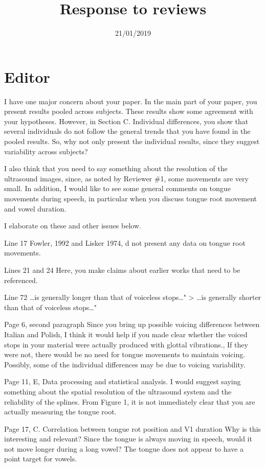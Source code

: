 \documentclass[]{article}
\title{Response to reviews}
\author{}
\date{21/01/2019}
\begin{document}
\maketitle

\hypertarget{editor}{%
\section{Editor}\label{editor}}

I have one major concern about your paper. In the main part of your
paper, you present results pooled across subjects. These results show
some agreement with your hypotheses. However, in Section C. Individual
differences, you show that several individuals do not follow the general
trends that you have found in the pooled results. So, why not only
present the individual results, since they suggest variability across
subjects?

I also think that you need to say something about the resolution of the
ultrasound images, since, as noted by Reviewer \#1, some movements are
very small. In addition, I would like to see some general comments on
tongue movements during speech, in particular when you discuss tongue
root movement and vowel duration.

I elaborate on these and other issues below.

Line 17 Fowler, 1992 and Lisker 1974, d not present any data on tongue
root movements.

Lines 21 and 24 Here, you make claims about earlier works that need to
be referenced.

Line 72 \ldots{}is generally longer than that of voiceless
stops\ldots{}" \textgreater{} \ldots{}is generally shorter than that of
voiceless stops\ldots{}"

Page 6, second paragraph Since you bring up possible voicing differences
between Italian and Polish, I think it would help if you made clear
whether the voiced stops in your material were actually produced with
glottal vibrations., If they were not, there would be no need for tongue
movements to maintain voicing. Possibly, some of the individual
differences may be due to voicing variability.

Page 11, E, Data processing and statistical analysis. I would suggest
saying something about the spatial resolution of the ultrasound system
and the reliability of the splines. From Figure 1, it is not immediately
clear that you are actually measuring the tongue root.

Page 17, C. Correlation between tongue rot position and V1 duration Why
is this interesting and relevant? Since the tongue is always moving in
speech, would it not move longer during a long vowel? The tongue does
not appear to have a point target for vowels.
\end{document}
